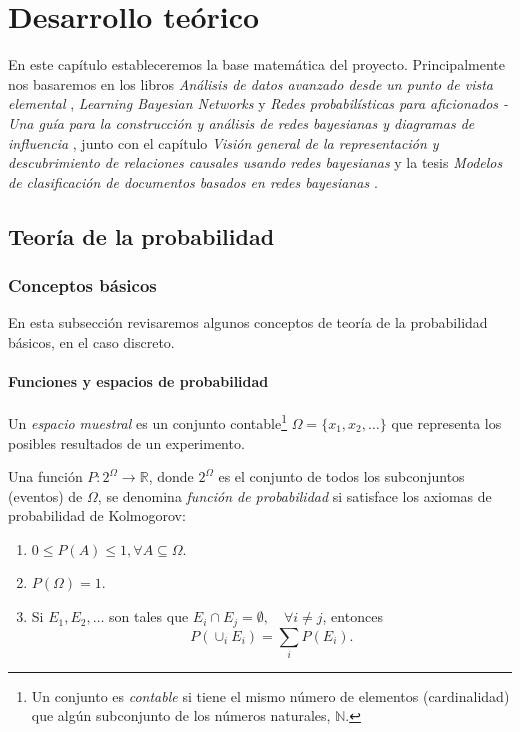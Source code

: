 \chapter{Desarrollo teórico}
En este capítulo estableceremos la base matemática del proyecto. Principalmente nos basaremos en 
los libros \textit{Análisis de datos avanzado desde un punto de vista elemental} \cite{ada}, 
\textit{Learning Bayesian Networks} \cite{neapolitan} 
y \textit{Redes probabilísticas para aficionados - Una guía para la construcción y análisis de redes 
bayesianas y diagramas de influencia} \cite{pgm}, junto con el capítulo 
\textit{Visión general de la representación y descubrimiento de relaciones causales usando redes 
bayesianas} \cite{cooper} y la tesis \textit{Modelos de clasificación de documentos basados en redes 
bayesianas} \cite{tesis-alfonso}.

\section{Teoría de la probabilidad}

\subsection{Conceptos básicos}
En esta subsección revisaremos algunos conceptos de teoría de la probabilidad básicos, en el 
caso discreto. 

\subsubsection{Funciones y espacios de probabilidad}
Un {\em espacio muestral} es un conjunto contable\footnote{Un conjunto es {\em contable} si tiene el mismo número de 
elementos (cardinalidad) que algún subconjunto de los números naturales, $\mathbb{N}$.} $\Omega = \{x_1, x_2, 
\dots \}$ que representa los posibles resultados de un experimento.

Una función $P : 2^\Omega \longrightarrow \mathbb{R}$, donde $2^\Omega$ es el conjunto de todos los 
subconjuntos (eventos) de $\Omega$, se denomina {\em función de probabilidad} si satisface los axiomas de 
probabilidad de Kolmogorov:

\begin{enumerate}
    \item $0 \leq P(A) \leq 1, \forall A  \subseteq \Omega$.
    \item $P(\Omega) = 1$.
    \item Si $E_1, E_2, \dots$ son tales que $E_i \cap E_j = \emptyset, \quad \forall i\neq j$, entonces
    $$P\left(\cup_i E_i\right) = \sum_i P(E_i).$$
\end{enumerate}

